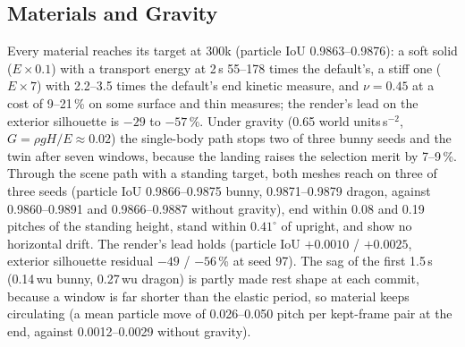 \subsection{Materials and Gravity}
\label{app:ch4_gravity}
Every material reaches its target at 300k (particle IoU 0.9863--0.9876): a soft solid ($E\times0.1$) with a transport energy at
2\,s 55--178 times the default's, a stiff one ($E\times7$) with 2.2--3.5 times the default's end kinetic measure, and
$\nu=0.45$ at a cost of 9--21\,\% on some surface and thin measures; the render's lead on the exterior silhouette is $-29$ to
$-57$\,\%. Under gravity (0.65 world units\,s$^{-2}$, $G=\rho gH/E\approx0.02$) the single-body path stops two of three bunny
seeds and the twin after seven windows, because the landing raises the selection merit by 7--9\,\%. Through the scene path with a
standing target, both meshes reach on three of three seeds (particle IoU 0.9866--0.9875 bunny, 0.9871--0.9879 dragon, against
0.9860--0.9891 and 0.9866--0.9887 without gravity), end within 0.08 and 0.19 pitches of the standing height, stand within
$0.41^\circ$ of upright, and show no horizontal drift. The render's lead holds (particle IoU $+0.0010$ / $+0.0025$, exterior
silhouette residual $-49$ / $-56$\,\% at seed 97). The sag of the first 1.5\,s (0.14\,wu bunny, 0.27\,wu dragon) is partly made
rest shape at each commit, because a window is far shorter than the elastic period, so material keeps circulating (a mean particle
move of 0.026--0.050 pitch per kept-frame pair at the end, against 0.0012--0.0029 without gravity).

